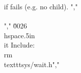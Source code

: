 if fails (e.g. no child). ","        \\\\","    \u0026 \\hspace{.5in}\\it Include: \\rm\\texttt{sys/wait.h}","    %